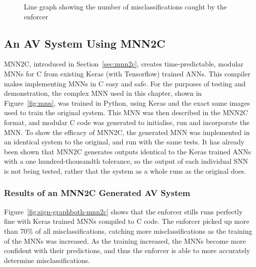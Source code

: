 
\begin{figure}[t]
	\centering
	\scalebox{0.9}{}
	\caption{Line graph showing the number of misclassifications caught by the enforcer \label{fig:sign-graphboth}}
\end{figure}

\subsection{An \ac{AV} System Using \acf{MNN2C}}
\ac{MNN2C}, introduced in Section~\ref{sec:mnn2c}, creates time-predictable, modular \acfp{MNN} for C from existing Keras (with Tensorflow) trained \acp{ANN}. 
This compiler makes implementing \acfp{MNN} in C easy and safe.
For the purposes of testing and demonstration, the complex \ac{MNN} used in this chapter, shown in Figure~\ref{fig:mnn}, was trained in Python, using Keras and the exact same images used to train the original system.
This \ac{MNN} was then described in the \ac{MNN2C} format, and modular C code was generated to initialise, run and incorporate the \ac{MNN}.
To show the efficacy of \ac{MNN2C}, the generated \ac{MNN} was implemented in an identical system to the original, and run with the same tests. 
It has already been shown that \ac{MNN2C} generates outputs identical to the Keras trained \acp{ANN} with a one hundred-thousandth tolerance, so the output of each individual \ac{SNN} is not being tested, rather that the system as a whole runs as the original does.

\subsubsection{Results of an \ac{MNN2C} Generated \ac{AV} System}
Figure~\ref{fig:sign-graphboth-mnn2c} shows that the enforcer stills runs perfectly fine with Keras trained \acp{MNN} compiled to C code.
The enforcer picked up more than 70\% of all misclassifications, catching more misclassifications as the training of the \acp{MNN} was increased. 
As the training increased, the \acp{MNN} become more confident with their predictions, and thus the enforcer is able to more accurately determine misclassifications.

